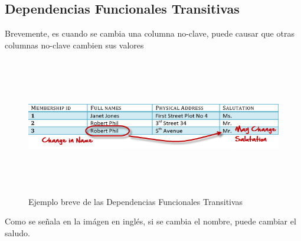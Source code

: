 \documentclass[letterpaper, 12pt]{article}
\begin{document}
\begin{justify}
        \section{Dependencias Funcionales Transitivas}
        \justify
        Brevemente, es cuando se cambia una columna no-clave, puede causar que otras columnas no-clave cambien sus valores
        \begin{figure}
            \centering
            \includegraphics[width=12cm,height=6cm]{transitive_functional_dependencies.png}
            \caption{Ejemplo breve de las Dependencias Funcionales Transitivas}
        \end{figure}
        \justify
        Como se señala en la imágen en inglés, si se cambia el nombre, puede cambiar el saludo.

\end{justify}
\end{document}
